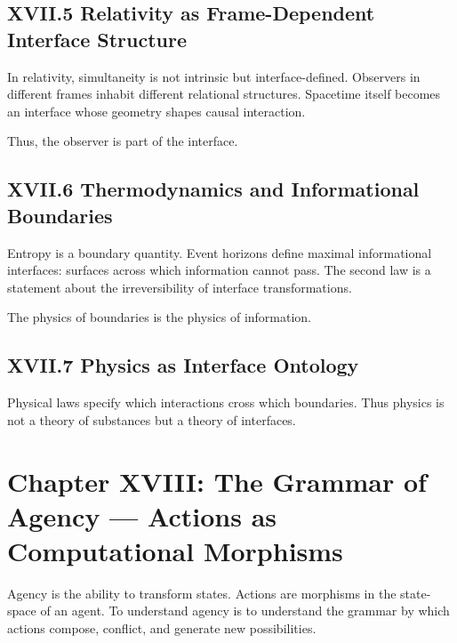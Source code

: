 \documentclass[12pt,letterpaper]{article}
\begin{document}
\subsection{XVII.5 Relativity as Frame-Dependent Interface Structure}

In relativity, simultaneity is not intrinsic but interface-defined. Observers in different frames inhabit different relational structures. Spacetime itself becomes an interface whose geometry shapes causal interaction.

Thus, the observer is part of the interface.

\subsection{XVII.6 Thermodynamics and Informational Boundaries}

Entropy is a boundary quantity. Event horizons define maximal informational interfaces: surfaces across which information cannot pass. The second law is a statement about the irreversibility of interface transformations.

The physics of boundaries is the physics of information.

\subsection{XVII.7 Physics as Interface Ontology}

Physical laws specify which interactions cross which boundaries. Thus physics is not a theory of substances but a theory of interfaces.

\newpage

\section{Chapter XVIII: The Grammar of Agency — Actions as Computational Morphisms}

Agency is the ability to transform states. Actions are morphisms in the state-space of an agent. To understand agency is to understand the grammar by which actions compose, conflict, and generate new possibilities.
\end{document}
